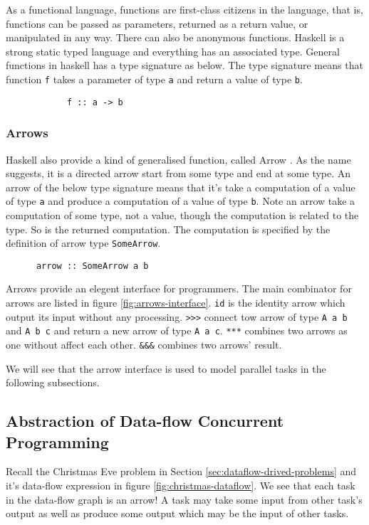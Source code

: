 \documentclass[conference]{IEEEtran}
\begin{document}
As a functional language, functions are first-class citizens in the language, that is, functions can be
passed as parameters, returned as a return value, or manipulated in any way. There can also be
anonymous functions. Haskell is a strong static typed language and everything has an associated type.
General functions in haskell has a type signature as below.
The type signature means that function \texttt{f} takes a parameter of
type \texttt{a} and return a value of type \texttt{b}.
\begin{verbatim}
            f :: a -> b
\end{verbatim}

\subsubsection{Arrows}
Haskell also provide a kind of generalised function, called Arrow \cite{Hughes2005}.
As the name suggests, it is
a directed arrow start from some type and end at some type. An arrow of the below type signature
means that it's take a computation of a value of type \texttt{a} and produce a computation of a value
of type \texttt{b}. Note an arrow take a computation of some type, not a value, though
the computation is related to the type. So is the returned computation. The computation is specified
by the definition of arrow type \texttt{SomeArrow}.
\begin{verbatim}
      arrow :: SomeArrow a b
\end{verbatim}

Arrows provide an elegent interface for programmers. The main combinator for arrows are listed in figure
\ref{fig:arrows-interface}. \texttt{id} is the identity arrow which output its input without any processing.
\texttt{>>>} connect tow arrow of type \texttt{A a b} and \texttt{A b c} and return a new arrow of type
\texttt{A a c}. \texttt{***} combines two arrows as one without affect each other. \texttt{\&\&\&} combines
two arrows' result.

We will see that the arrow interface is used to model parallel tasks in the following subsections.

\subsection{Abstraction of Data-flow Concurrent Programming}\label{subsec:abstraction-of-dataflow}
Recall the Christmas Eve problem in Section \ref{sec:dataflow-drived-problems}
and it's data-flow expression in figure \ref{fig:christmas-dataflow}.
We see that each task in the data-flow graph is an arrow! A task
may take some input from other task's output as well as produce some output which may be the
input of other tasks.
\end{document}
